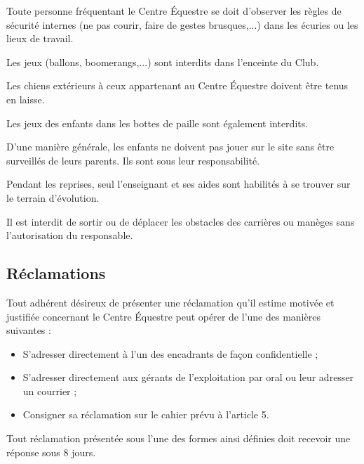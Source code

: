 \documentclass[11pt,a4paper]{article}
\begin{document}
Toute personne fréquentant le Centre Équestre se doit d'observer les règles de sécurité internes (ne pas courir, faire de gestes brusques,...) dans les écuries ou les lieux de travail.

Les jeux (ballons, boomerangs,...) sont interdits dans l'enceinte du Club.\par
Les chiens extérieurs à ceux appartenant au Centre Équestre doivent être tenus en laisse.\par
Les jeux des enfants dans les bottes de paille sont également interdits.

D'une manière générale, les enfants ne doivent pas jouer sur le site sans être surveillés de leurs parents. Ils sont sous leur responsabilité.

Pendant les reprises, seul l'enseignant et ses aides sont habilités à se trouver sur le terrain d'évolution.

Il est interdit de sortir ou de déplacer les obstacles des carrières ou manèges sans l'autorisation du responsable.

\subsection{Réclamations}
Tout adhérent désireux de présenter une réclamation qu'il estime motivée et justifiée concernant le Centre Équestre peut opérer de l'une des manières suivantes :
\begin{itemize}[leftmargin=50pt]
\item
S'adresser directement à l'un des encadrants de façon confidentielle ;
\item
S'adresser directement aux gérants de l'exploitation par oral ou leur adresser un courrier ;
\item
Consigner sa réclamation sur le cahier prévu à l'article 5.
\end{itemize}
Tout réclamation présentée sous l'une des formes ainsi définies doit recevoir une réponse sous 8 jours.
\end{document}
